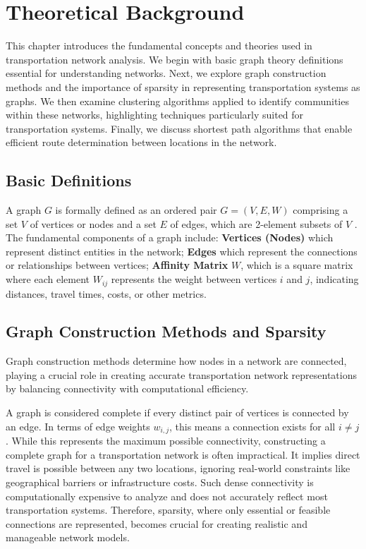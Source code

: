 \chapter{Theoretical Background}
\label{ch:basics}
This chapter introduces the fundamental concepts and theories used in transportation network analysis. We begin with basic graph theory definitions essential for understanding networks. Next, we explore graph construction methods and the importance of sparsity in representing transportation systems as graphs. We then examine clustering algorithms applied to identify communities within these networks, highlighting techniques particularly suited for transportation systems. Finally, we discuss shortest path algorithms that enable efficient route determination between locations in the network.
\section{Basic Definitions}
\label{se:BasicDefinitions}

A graph $G$ is formally defined as an ordered pair $G = (V, E, W)$ comprising a set $V$ of vertices or nodes and a set $E$ of edges, which are 2-element subsets of $V$ . The fundamental components of a graph include: \textbf{Vertices (Nodes)} which represent distinct entities in the network; \textbf{Edges} which represent the connections or relationships between vertices; \textbf{Affinity Matrix} $W$, which is a square matrix where each element $W_{ij}$ represents the weight between vertices $i$ and $j$, indicating distances, travel times, costs, or other metrics.


\section{Graph Construction Methods and Sparsity}
\label{se:GraphConstructionMethodsAndSparsity}

Graph construction methods determine how nodes in a network are connected, playing a crucial role in creating accurate transportation network representations by balancing connectivity with computational efficiency.

A graph is considered complete if every distinct pair of vertices is connected by an edge. In terms of edge weights \(w_{i,j}\), this means a connection exists for all \(i \neq j\). While this represents the maximum possible connectivity, constructing a complete graph for a transportation network is often impractical. It implies direct travel is possible between any two locations, ignoring real-world constraints like geographical barriers or infrastructure costs. Such dense connectivity is computationally expensive to analyze and does not accurately reflect most transportation systems. Therefore, sparsity, where only essential or feasible connections are represented, becomes crucial for creating realistic and manageable network models.

